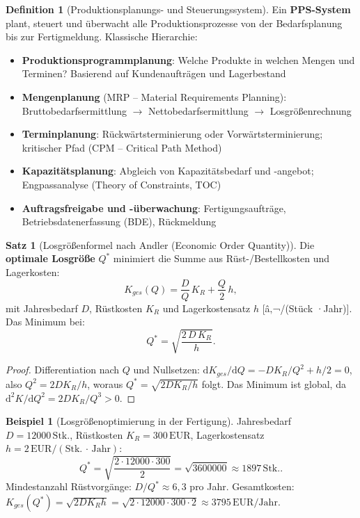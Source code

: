 ﻿\documentclass[a4paper,12pt]{report}
\theoremstyle{definition}
\newtheorem{definition}{Definition}
\newtheorem{beispiel}{Beispiel}
\newtheorem{satz}{Satz}
\begin{document}
\begin{definition}[Produktionsplanungs- und Steuerungssystem]
Ein \textbf{PPS-System} plant, steuert und überwacht alle Produktionsprozesse
von der Bedarfsplanung bis zur Fertigmeldung. Klassische Hierarchie:
\begin{itemize}
    \item[-] \textbf{Produktionsprogrammplanung}: Welche Produkte in welchen Mengen
          und Terminen? Basierend auf Kundenaufträgen und Lagerbestand
    \item[-] \textbf{Mengenplanung} (MRP -- Material Requirements Planning):
          Bruttobedarfsermittlung $\to$ Nettobedarfsermittlung $\to$ Losgrößenrechnung
    \item[-] \textbf{Terminplanung}: Rückwärtsterminierung oder Vorwärtsterminierung;
          kritischer Pfad (CPM -- Critical Path Method)
    \item[-] \textbf{Kapazitätsplanung}: Abgleich von Kapazitätsbedarf und
          -angebot; Engpassanalyse (Theory of Constraints, TOC)
    \item[-] \textbf{Auftragsfreigabe und -überwachung}: Fertigungsaufträge,
          Betriebsdatenerfassung (BDE), Rückmeldung
\end{itemize}
\end{definition}

\begin{satz}[Losgrößenformel nach Andler (Economic Order Quantity)]
Die \textbf{optimale Losgröße} $Q^*$ minimiert die Summe aus Rüst-/Bestellkosten
und Lagerkosten:
\[
  K_{ges}(Q) = \frac{D}{Q}\,K_R + \frac{Q}{2}\,h,
\]
mit Jahresbedarf $D$, Rüstkosten $K_R$ und Lagerkostensatz $h$ [â‚¬/(Stück ·Jahr)].
Das Minimum bei:
\[
  Q^* = \sqrt{\frac{2\,D\,K_R}{h}}.
\]
\end{satz}
\begin{proof}
Differentiation nach $Q$ und Nullsetzen:
$\mathrm{d}K_{ges}/\mathrm{d}Q = -DK_R/Q^2 + h/2 = 0$,
also $Q^2 = 2DK_R/h$, woraus $Q^* = \sqrt{2DK_R/h}$ folgt.
Das Minimum ist global, da $\mathrm{d}^2K/\mathrm{d}Q^2 = 2DK_R/Q^3 > 0$.
\end{proof}

\begin{beispiel}[Losgrößenoptimierung in der Fertigung]
Jahresbedarf $D = 12000\,\mathrm{Stk.}$, Rüstkosten $K_R = 300\,\mathrm{EUR}$,
Lagerkostensatz $h = 2\,\mathrm{EUR/(Stk.\,\cdot\,Jahr)}$:
\[
  Q^* = \sqrt{\frac{2\cdot12000\cdot300}{2}} = \sqrt{3600000} \approx 1897\,\mathrm{Stk.}.
\]
Mindestanzahl Rüstvorgänge: $D/Q^* \approx 6{,}3$ pro Jahr.
Gesamtkosten: $K_{ges}(Q^*) = \sqrt{2DK_Rh} = \sqrt{2\cdot12000\cdot300\cdot2}
\approx 3795\,\mathrm{EUR/Jahr}$.
\end{beispiel}
\end{document}
